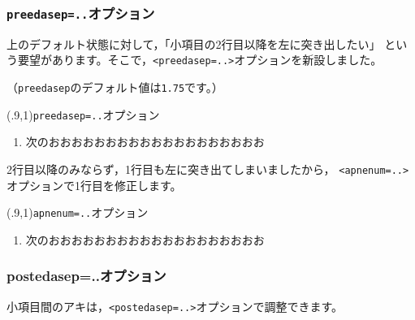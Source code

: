 \documentclass[fleqn,a4j]{jarticle}
\begin{document}
\subsubsection{\texttt{preedasep=..}オプション}
上のデフォルト状態に対して，「小項目の2行目以降を左に突き出したい」
という要望があります。そこで，\verb+<preedasep=..>+オプションを新設しました。

（\texttt{preedasep}のデフォルト値は\texttt{1.75\zw}です。）
\newpage

\begin{showEx}(.9,1){\texttt{preedasep=..}オプション}
\begin{enumerate}[1.~]
  \item 次のおおおおおおおおおおおおおおおおおおお
\end{enumerate}
\end{showEx}

2行目以降のみならず，1行目も左に突き出てしまいましたから，
\verb+<apnenum=..>+オプションで1行目を修正します。

\begin{showEx}(.9,1){\texttt{apnenum=..}オプション}
\begin{enumerate}[1.~]
  \item 次のおおおおおおおおおおおおおおおおおおお
\end{enumerate}
\end{showEx}

\subsubsection{\textsf{postedasep=..}オプション}
小項目間のアキは，\verb+<postedasep=..>+オプションで調整できます。
\end{document}
